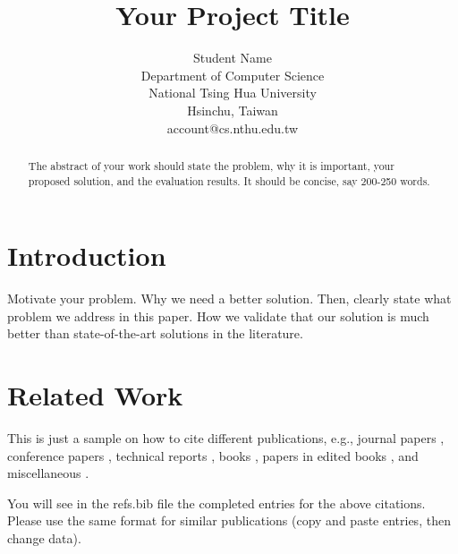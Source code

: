 \documentclass[11pt, draftclsnofoot, onecolumn]{IEEEtran}
\begin{document}
\title{Your Project Title}

\author{Student Name\\
        Department of Computer Science\\
        National Tsing Hua University\\
        Hsinchu, Taiwan\\
        account@cs.nthu.edu.tw \\ 
}


\date{}
\maketitle

\begin{abstract}

The abstract of your work should state the problem, why it is important, your
proposed solution, and the evaluation results. It should be concise, say
200-250 words.

\end{abstract}


\section{Introduction} \label{sec:introduction}

Motivate your problem. Why we need a better solution. Then, clearly state what
problem we address in this paper. How we validate that our solution is much
better than state-of-the-art solutions in the literature. 

\section{Related Work} \label{sec:related}

This is just a sample on how to cite different publications, e.g., 
journal papers \cite{MEVS03}, conference papers \cite{SGD+02}, 
technical reports \cite{MKL+02}, books \cite{comerV1}, papers 
in edited books \cite{CP02}, and miscellaneous \cite{freePastry, nntp}. 

You will see in the refs.bib file the completed entries for the above 
citations. Please use the same format for similar publications  
(copy and paste entries, then change data). 
\end{document}
